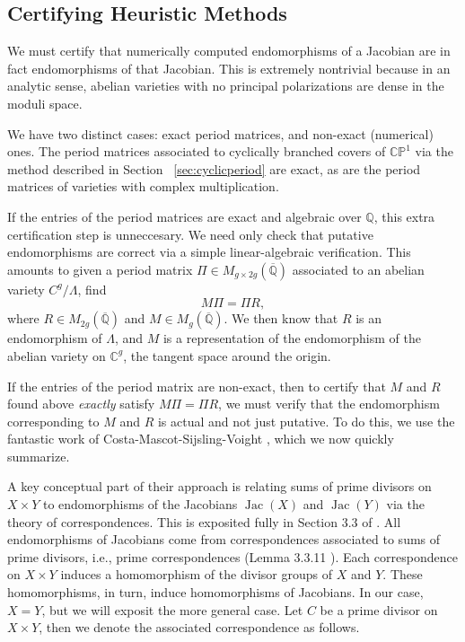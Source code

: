 \documentclass[12pt,reqno]{amsart}
\DeclareMathOperator{\Jac}{Jac}
\newcommand{\C}{\mathbb{C}}
\newcommand{\Q}{\mathbb{Q}}
\renewcommand{\P}{\mathbb{P}}
\theoremstyle{definition}
\theoremstyle{remark}
\begin{document}
\subsection{Certifying Heuristic Methods}
\label{sec:cert}

We must certify that numerically computed endomorphisms of a Jacobian are in fact endomorphisms of that Jacobian. This is extremely nontrivial because in an analytic sense, abelian varieties with no principal polarizations are dense in the moduli space. 

We have two distinct cases: exact period matrices, and non-exact (numerical) ones. The period matrices associated to cyclically branched covers of $\C\P^1$ via the method described in Section ~\ref{sec:cyclicperiod} are exact, as are the period matrices of varieties with complex multiplication. 

If the entries of the period matrices are exact and algebraic over $\Q$, this extra certification step is unneccesary. We need only check that putative endomorphisms are correct via a simple linear-algebraic verification. This amounts to given a period matrix $\Pi \in M_{g \times 2g}(\overline{\Q})$ associated to an abelian variety $C^g/\Lambda$, find
$$M \Pi = \Pi R,$$
where $R \in  M_{2g}(\overline{\Q})$ and $M \in M_{g}(\overline{\Q})$. We then know that $R$ is an endomorphism of $\Lambda$, and $M$ is a representation of the endomorphism of the abelian variety on $\C^g$, the tangent space around the origin.

If the entries of the period matrix are non-exact, then to certify that $M$ and $R$ found above \textit{exactly} satisfy $M \Pi = \Pi R$, we must verify that the endomorphism corresponding to $M$ and $R$ is actual and not just putative. To do this, we use the fantastic work of Costa-Mascot-Sijsling-Voight \cite{rigor}, which we now quickly summarize. 

A key conceptual part of their approach is relating sums of prime divisors on $X \times Y$ to endomorphisms of the Jacobians $\Jac(X)$ and $\Jac(Y)$ via the theory of correspondences. This is exposited fully in Section 3.3 of \cite{smith}. All endomorphisms of Jacobians come from correspondences associated to sums of prime divisors, i.e., prime correspondences (Lemma 3.3.11 \cite{smith}). Each correspondence on $X \times Y$ induces a homomorphism of the divisor groups of $X$ and $Y$. These homomorphisms, in turn, induce homomorphisms of Jacobians. In our case, $X=Y$, but we will exposit the more general case. Let $C$ be a prime divisor on $X \times Y$, then we denote the associated correspondence as follows.
\end{document}

